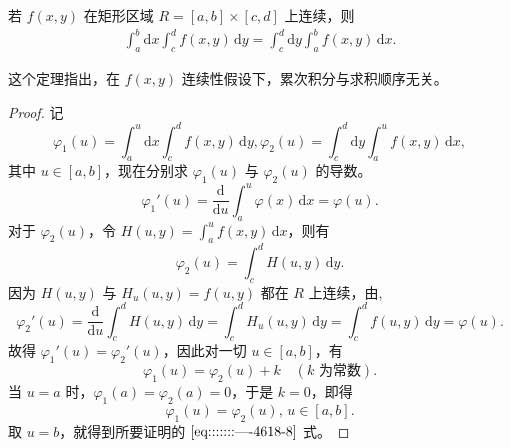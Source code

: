 \documentclass[../../main.tex]{subfiles}
\begin{document}
\begin{theorem}
若 \( f(x,y) \) 在矩形区域 \( R = [a,b] \times [c,d] \) 上连续，则
\begin{align}
\int_{a}^{b} \mathrm{d}x \int_{c}^{d} f(x,y) \, \mathrm{d}y = \int_{c}^{d} \mathrm{d}y \int_{a}^{b} f(x,y) \, \mathrm{d}x. \label{eq:::::::----4618-8}
\end{align}
\end{theorem}
\begin{note}
这个定理指出，在 \( f(x,y) \) 连续性假设下，累次积分与求积顺序无关。
\end{note}
\begin{proof}
记
\[
\varphi_1(u) = \int_{a}^{u} \mathrm{d}x \int_{c}^{d} f(x,y) \, \mathrm{d}y,
\varphi_2(u) = \int_{c}^{d} \mathrm{d}y \int_{a}^{u} f(x,y) \, \mathrm{d}x,
\]
其中 \( u \in [a,b] \)，现在分别求 \( \varphi_1(u) \) 与 \( \varphi_2(u) \) 的导数。
\[
\varphi_1'(u) = \frac{\mathrm{d}}{\mathrm{d}u} \int_{a}^{u} \varphi(x) \, \mathrm{d}x = \varphi(u).
\]
对于 \( \varphi_2(u) \)，令 \( H(u,y) = \int_{a}^{u} f(x,y) \, \mathrm{d}x \)，则有
\[
\varphi_2(u) = \int_{c}^{d} H(u,y) \, \mathrm{d}y.
\]
因为 \( H(u,y) \) 与 \( H_u(u,y) = f(u,y) \) 都在 \( R \) 上连续，由,
\[
\varphi_2'(u) = \frac{\mathrm{d}}{\mathrm{d}u} \int_{c}^{d} H(u,y) \, \mathrm{d}y = \int_{c}^{d} H_u(u,y) \, \mathrm{d}y
= \int_{c}^{d} f(u,y) \, \mathrm{d}y = \varphi(u).
\]
故得 \( \varphi_1'(u) = \varphi_2'(u) \)，因此对一切 \( u \in [a,b] \)，有
\[
\varphi_1(u) = \varphi_2(u) + k \quad (k \text{ 为常数}).
\]
当 \( u = a \) 时，\( \varphi_1(a) = \varphi_2(a) = 0 \)，于是 \( k = 0 \)，即得
\[
\varphi_1(u) = \varphi_2(u), \, u \in [a,b].
\]
取 \( u = b \)，就得到所要证明的 \(\eqref{eq:::::::----4618-8}\) 式。

\end{proof}
\end{document}

